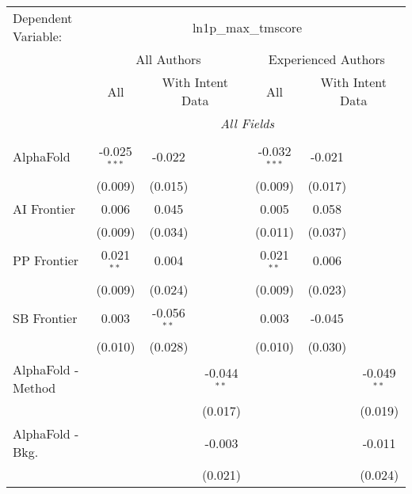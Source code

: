 \begingroup
\centering
\begin{tabular}{lcccccc}
   \tabularnewline \midrule \midrule
   Dependent Variable: & \multicolumn{6}{c}{ln1p\_max\_tmscore}\\
 & \multicolumn{3}{c}{All Authors} & \multicolumn{3}{c}{Experienced Authors} \\
\cmidrule(lr){2-4} \cmidrule(lr){5-7}
 & \multicolumn{1}{c}{All} & \multicolumn{2}{c}{With Intent Data} & \multicolumn{1}{c}{All} & \multicolumn{2}{c}{With Intent Data} \\
\cmidrule(lr){2-2} \cmidrule(lr){3-4} \cmidrule(lr){5-5} \cmidrule(lr){6-7}
 & \multicolumn{6}{c}{\textit{All Fields}} \\ \\
   AlphaFold            & -0.025$^{***}$ & -0.022        &                & -0.032$^{***}$ & -0.021  &   \\   
                        & (0.009)        & (0.015)       &                & (0.009)        & (0.017) &   \\   
   AI Frontier          & 0.006          & 0.045         &                & 0.005          & 0.058   &   \\   
                        & (0.009)        & (0.034)       &                & (0.011)        & (0.037) &   \\   
   PP Frontier          & 0.021$^{**}$   & 0.004         &                & 0.021$^{**}$   & 0.006   &   \\   
                        & (0.009)        & (0.024)       &                & (0.009)        & (0.023) &   \\   
   SB Frontier          & 0.003          & -0.056$^{**}$ &                & 0.003          & -0.045  &   \\   
                        & (0.010)        & (0.028)       &                & (0.010)        & (0.030) &   \\   
   AlphaFold - Method   &                &               & -0.044$^{**}$  &                &         & -0.049$^{**}$\\   
                        &                &               & (0.017)        &                &         & (0.019)\\   
   AlphaFold - Bkg.     &                &               & -0.003         &                &         & -0.011\\   
                        &                &               & (0.021)        &                &         & (0.024)\\   

\end{tabular}
